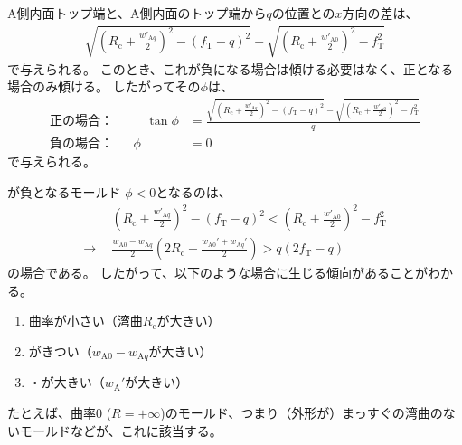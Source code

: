 \subsection{\DimpleAngle}
A側内面トップ端と、A側内面のトップ端から$q$の位置との$x$方向の差は、
\begin{align*}
  \sqrt{\left(R_\mathrm c+\frac{w'_{\mathrm Aq}}2\right)^2-(f_\mathrm T-q)^2}
  -\sqrt{\left(R_\mathrm c+\frac{w'_{\mathrm A0}}2\right)^2-f_\mathrm T^2}
\end{align*}
で与えられる。
このとき、これが負になる場合は傾ける必要はなく、正となる場合のみ傾ける。
したがってその\DimpleAngle$\phi$は、
\begin{subequations}
\label{eq:dKatamuki}
\begin{alignat}{2}
  \text{正の場合：}&&\quad
  \tan\phi
  &= \frac{\displaystyle
           \sqrt{\left(R_\mathrm c+\frac{w'_{\mathrm Aq}}2\right)^2-(f_\mathrm T-q)^2}
           -\sqrt{\left(R_\mathrm c+\frac{w'_{\mathrm A0}}2\right)^2-f_\mathrm T^2}}q\\[8pt]
  \text{負の場合：}&&
  \phi
  &= 0
\end{alignat}
\end{subequations}
で与えられる。
\begin{\Columnname}{\DimpleAngle が負となるモールド}
$\phi < 0$となるのは、
\begin{align*}
  & \left(R_\mathrm c+\frac{w'_{\mathrm Aq}}2\right)^2-(f_\mathrm T-q)^2
    < \left(R_\mathrm c+\frac{w'_{\mathrm A0}}2\right)^2-f_\mathrm T^2\\
  \longrightarrow~~
  & \frac{w_{\mathrm A0}-w_{\mathrm Aq}}2
    \left(2R_\mathrm c+\frac{w_{\mathrm A0}'+w_{\mathrm Aq}'}2\right)
    > q(2f_\mathrm T-q)
\end{align*}
の場合である。
したがって、以下のような場合に生じる傾向があることがわかる。
\begin{enumerate}
\item {}曲率が小さい（湾曲$R_\mathrm c$が大きい）
\item \IDTaper がきつい（$w_{\mathrm A0}-w_{\mathrm Aq}$が大きい）
\item \InnerDiameter・\PlatingThk が大きい（$w_\mathrm A'$が大きい）
\end{enumerate}
たとえば、曲率0 ($R = +\infty$)のモールド、つまり（外形が）まっすぐの湾曲のないモールドなどが、これに該当する。
\end{\Columnname}

